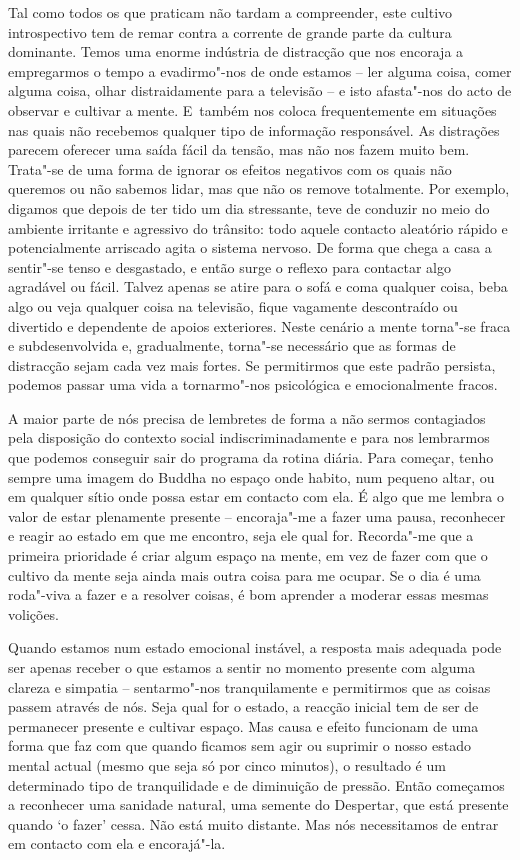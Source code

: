 Tal como todos os que praticam não tardam a compreender, este cultivo
introspectivo tem de remar contra a corrente de grande parte da cultura
dominante. Temos uma enorme indústria de distracção que nos encoraja a
empregarmos o tempo a evadirmo"-nos de onde estamos -- ler alguma coisa, comer
alguma coisa, olhar distraidamente para a televisão -- e isto afasta"-nos do acto
de observar e cultivar a mente. E~também nos coloca frequentemente em situações
nas quais não recebemos qualquer tipo de informação responsável. As distrações
parecem oferecer uma saída fácil da tensão, mas não nos fazem muito bem.
Trata"-se de uma forma de ignorar os efeitos negativos com os quais não queremos
ou não sabemos lidar, mas que não os remove totalmente. Por exemplo, digamos que
depois de ter tido um dia stressante, teve de conduzir no meio do ambiente
irritante e agressivo do trânsito: todo aquele contacto aleatório rápido e
potencialmente arriscado agita o sistema nervoso. De forma que chega a casa a
sentir"-se tenso e desgastado, e então surge o reflexo para contactar algo
agradável ou fácil. Talvez apenas se atire para o sofá e coma qualquer coisa,
beba algo ou veja qualquer coisa na televisão, fique vagamente descontraído ou
divertido e dependente de apoios exteriores. Neste cenário a mente torna"-se
fraca e subdesenvolvida e, gradualmente, torna"-se necessário que as formas de
distracção sejam cada vez mais fortes. Se permitirmos que este padrão persista,
podemos passar uma vida a tornarmo"-nos psicológica e emocionalmente fracos.

A maior parte de nós precisa de lembretes de forma a não sermos contagiados pela
disposição do contexto social indiscriminadamente e para nos lembrarmos que
podemos conseguir sair do programa da rotina diária. Para começar, tenho sempre
uma imagem do Buddha no espaço onde habito, num pequeno altar, ou em qualquer
sítio onde possa estar em contacto com ela. É algo que me lembra o valor de
estar plenamente presente -- encoraja"-me a fazer uma pausa, reconhecer e reagir
ao estado em que me encontro, seja ele qual for. Recorda"-me que a primeira
prioridade é criar algum espaço na mente, em vez de fazer com que o cultivo da
mente seja ainda mais outra coisa para me ocupar. Se o dia é uma roda"-viva a
fazer e a resolver coisas, é bom aprender a moderar essas mesmas volições.

Quando estamos num estado emocional instável, a resposta mais adequada pode ser
apenas receber o que estamos a sentir no momento presente com alguma clareza e
simpatia -- sentarmo"-nos tranquilamente e permitirmos que as coisas passem
através de nós. Seja qual for o estado, a reacção inicial tem de ser de
permanecer presente e cultivar espaço. Mas causa e efeito funcionam de uma forma
que faz com que quando ficamos sem agir ou suprimir o nosso estado mental actual
(mesmo que seja só por cinco minutos), o resultado é um determinado tipo de
tranquilidade e de diminuição de pressão. Então começamos a reconhecer uma
sanidade natural, uma semente do Despertar, que está presente quando `o fazer'
cessa. Não está muito distante. Mas nós necessitamos de entrar em contacto com
ela e encorajá"-la.

